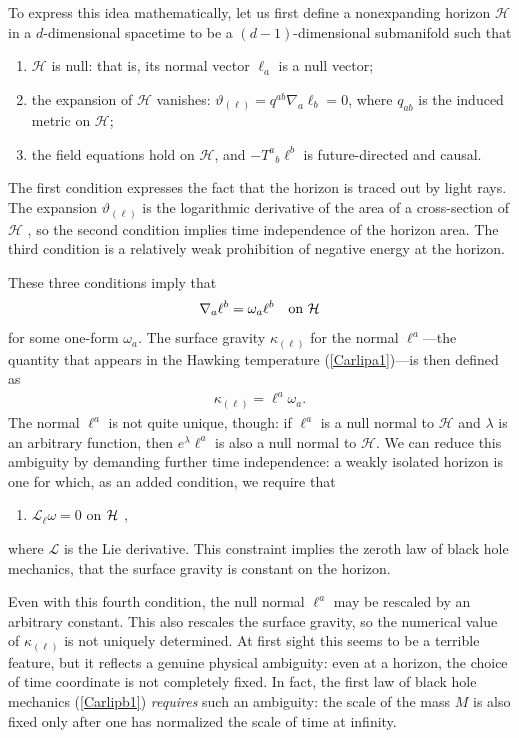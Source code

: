 \documentclass[12pt]{article}
\begin{document}
\begin{appendix}
To express this idea mathematically, let us first define a 
nonexpanding horizon $\mathcal{H}$ in a $d$-dimensional 
spacetime to be a $(d-1)$-dimensional submanifold such that 
\cite{Ashisol,Ashisolb}
\begin{enumerate}
\item $\mathcal{H}$ is null: that is, its normal vector $\ell_a$
 is a null vector;
\item the expansion of $\mathcal{H}$ vanishes: $\vartheta_{(\ell)}
 = q^{ab}\nabla_a\ell_b = 0$, where $q_{ab}$ is the induced metric
 on $\mathcal{H}$;
\item the field equations hold on $\mathcal{H}$, and $-T^a{}_b\ell^b$ 
is future-directed and causal.
\end{enumerate}
The first condition expresses the fact that the horizon is traced
out by light rays.  The expansion $\vartheta_{(\ell)}$ is
the logarithmic derivative of the area of a cross-section of 
$\mathcal{H}$ \cite{Poisson}, so the second condition implies
time independence of the horizon area.  The third condition 
is a relatively weak prohibition of negative energy at the horizon.

These three conditions imply that
$$\nabla_a\ell^b = \omega_a\ell^b \quad\hbox{on $\mathcal{H}$} $$
for some one-form $\omega_a$.  The surface gravity $\kappa_{(\ell)}$ 
for the normal $\ell^a$---the quantity that appears in the Hawking
temperature (\ref{Carlipa1})---is then defined as
\begin{align}
\kappa_{(\ell)} = \ell^a\omega_a .
\label{CarlipApp1}
\end{align}
The normal $\ell^a$ is not quite unique, though: if $\ell^a$ is a null 
normal to $\mathcal{H}$ and $\lambda$ is an arbitrary function, then
$e^\lambda\ell^a$ is also a null normal to $\mathcal{H}$.  We can 
reduce this ambiguity by demanding further time independence:  a 
weakly isolated horizon is one for which, as an added condition,
we require that
\begin{enumerate}{\setcounter{enumi}{3}}
\item ${\mathcal{L}}_\ell\omega = 0$ on $\cal H$ ,
\end{enumerate}
where $\mathcal{L}$ is the Lie derivative.  
This constraint implies the zeroth law of black hole mechanics, that 
the surface gravity is constant on the horizon.   

Even with this fourth condition, the null normal $\ell^a$ may be 
rescaled by an arbitrary constant.  This also rescales the surface 
gravity, so the numerical value of $\kappa_{(\ell)}$ is not uniquely
determined.  
At first sight this seems to be a terrible feature, but it reflects 
a genuine physical ambiguity: even at a horizon, the choice
of time coordinate is not completely fixed.  In fact, the first law of 
black hole mechanics (\ref{Carlipb1}) \emph{requires} such an 
ambiguity: the scale of the mass $M$ is also fixed only after 
one has normalized the scale of time at infinity.


\end{appendix}
\end{document}
